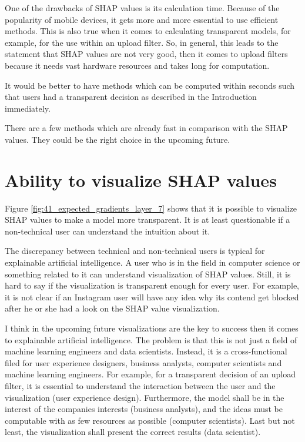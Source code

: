One of the drawbacks of SHAP values is its calculation time. Because of the popularity of mobile devices, it gets more and more essential to use efficient methods. This is also true when it comes to calculating transparent models, for example, for the use within an upload filter. So, in general, this leads to the statement that SHAP values are not very good, then it comes to upload filters because it needs vast hardware resources and takes long for computation. 

It would be better to have methods which can be computed within seconds such that users had a transparent decision as described in the Introduction immediately. 

There are a few methods which are already fast in comparison with the SHAP values. They could be the right choice in the upcoming future.

\section{Ability to visualize SHAP values}

Figure \ref{fig:41_expected_gradients_layer_7} shows that it is possible to visualize SHAP values to make a model more transparent. It is at least questionable if a non-technical user can understand the intuition about it. 

The discrepancy between technical and non-technical users is typical for explainable artificial intelligence. A user who is in the field in computer science or something related to it can understand visualization of SHAP values. Still, it is hard to say if the visualization is transparent enough for every user. For example, it is not clear if an Instagram user will have any idea why its contend get blocked after he or she had a look on the SHAP value visualization. 

I think in the upcoming future visualizations are the key to success then it comes to explainable artificial intelligence. The problem is that this is not just a field of machine learning engineers and data scientists. Instead, it is a cross-functional filed for user experience designers, business analysts, computer scientists and machine learning engineers. For example, for a transparent decision of an upload filter, it is essential to understand the interaction between the user and the visualization (user experience design). Furthermore, the model shall be in the interest of the companies interests (business analysts), and the ideas must be computable with as few resources as possible (computer scientists). Last but not least, the visualization shall present the correct results (data scientist). 
